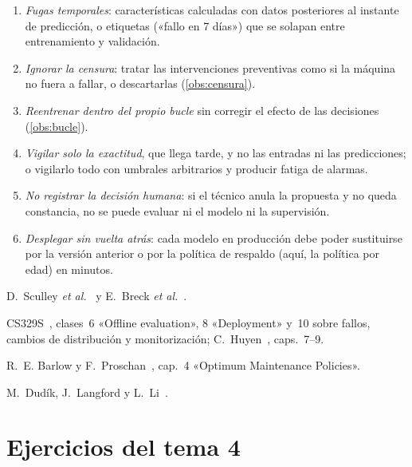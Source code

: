 \begin{observacion}\label{obs:errores4}
\begin{enumerate}[label=(\alph*)]
  \item \emph{Fugas temporales}: características calculadas con datos posteriores al instante de predicción, o etiquetas («fallo en 7 días») que se solapan entre entrenamiento y validación.
  \item \emph{Ignorar la censura}: tratar las intervenciones preventivas como si la máquina no fuera a fallar, o descartarlas (\cref{obs:censura}).
  \item \emph{Reentrenar dentro del propio bucle} sin corregir el efecto de las decisiones (\cref{obs:bucle}).
  \item \emph{Vigilar solo la exactitud}, que llega tarde, y no las entradas ni las predicciones; o vigilarlo todo con umbrales arbitrarios y producir fatiga de alarmas.
  \item \emph{No registrar la decisión humana}: si el técnico anula la propuesta y no queda constancia, no se puede evaluar ni el modelo ni la supervisión.
  \item \emph{Desplegar sin vuelta atrás}: cada modelo en producción debe poder sustituirse por la versión anterior o por la política de respaldo (aquí, la política por edad) en minutos.
\end{enumerate}
\end{observacion}

\begin{lecturas}
\item D.~Sculley \emph{et al.}~\cite{sculley} y E.~Breck \emph{et al.}~\cite{breck}.
\item CS329S~\cite{cs329s}, clases~6 «Offline evaluation», 8 «Deployment» y~10 sobre fallos, cambios de distribución y monitorización; C.~Huyen~\cite{huyen}, caps.~7--9.
\item R.~E. Barlow y F.~Proschan~\cite{bp}, cap.~4 «Optimum Maintenance Policies».
\item M.~Dudík, J.~Langford y L.~Li~\cite{dudik}.
\end{lecturas}

\section*{Ejercicios del tema 4}

